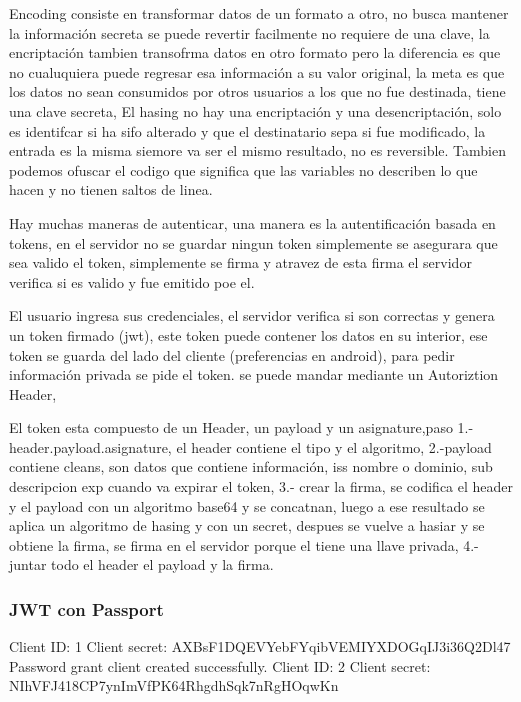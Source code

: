\documentclass[a4paper]{article}
\begin{document}
	Encoding consiste en transformar datos de un formato a otro, no busca mantener la información secreta se puede revertir facilmente no requiere de una clave, la encriptación tambien transofrma datos en otro formato pero la diferencia es que no cualuquiera puede regresar esa información a su valor original, la meta es que los datos no sean consumidos por otros usuarios a los que no fue destinada, tiene una clave secreta, El hasing no hay una encriptación y una desencriptación, solo es identifcar si ha sifo alterado y que el destinatario sepa si fue modificado, la entrada es la misma siemore va ser el mismo resultado, no es reversible. Tambien podemos ofuscar el codigo que significa que las variables no describen lo que hacen y no tienen saltos de linea.
	
	Hay muchas maneras de autenticar, una manera es la autentificación basada en tokens, en el servidor no se guardar ningun token simplemente se asegurara que sea valido el token, simplemente se firma y atravez de esta firma el servidor verifica si es valido y fue emitido poe el.
	
	El usuario ingresa sus credenciales, el servidor verifica si son correctas y genera un token firmado (jwt), este token puede contener los datos en su interior, ese token se guarda del lado del cliente (preferencias en android), para pedir información privada se pide el token. se puede mandar mediante un Autoriztion Header,
	
	El token esta compuesto de un Header, un payload y un asignature,paso 1.-  header.payload.asignature, el header contiene el tipo y el algoritmo, 2.-payload contiene cleans, son datos que contiene información, iss nombre o dominio, sub descripcion exp cuando va expirar el token, 3.- crear la firma, se codifica el header y el payload con un algoritmo base64 y se concatnan, luego a ese resultado se aplica un algoritmo de hasing y con un secret, despues se vuelve a hasiar y se obtiene la firma, se firma en el servidor porque el tiene una llave privada, 4.- juntar todo el header el payload y la firma.
	
	\subsubsection{JWT con Passport}
	
	
	Client ID: 1
	Client secret: AXBsF1DQEVYebFYqibVEMIYXDOGqIJ3i36Q2Dl47
	Password grant client created successfully.
	Client ID: 2
	Client secret: NIhVFJ418CP7ynImVfPK64RhgdhSqk7nRgHOqwKn
	
\end{document}

